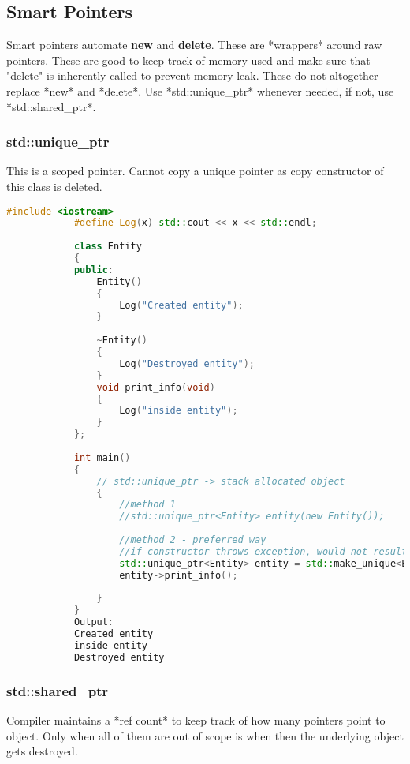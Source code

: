 \documentclass{article}
\begin{document}
    \subsection{Smart Pointers}
        Smart pointers automate \textbf{new} and \textbf{delete}. These are *wrappers* around raw pointers.
        These are good to keep track of memory used and make sure that "delete" is inherently called to prevent memory leak. 
        These do not altogether replace *new* and *delete*. 
        Use *std::unique\_ptr* whenever needed, if not, use *std::shared\_ptr*.
        
        \subsubsection{std::unique\_ptr}
        This is a scoped pointer. 
        Cannot copy a unique pointer as copy constructor of this class is deleted.
        
        \begin{lstlisting}[language=C++, caption=std::unique\_ptr example]
            #include <iostream>
            #define Log(x) std::cout << x << std::endl;
            
            class Entity
            {
            public:
            	Entity()
            	{
            		Log("Created entity");
            	}
            
            	~Entity()
            	{
            		Log("Destroyed entity");
            	}
            	void print_info(void)
            	{
            		Log("inside entity");
            	}
            };
            
            int main()
            {
            	// std::unique_ptr -> stack allocated object
            	{
            		//method 1
            		//std::unique_ptr<Entity> entity(new Entity());
            
            		//method 2 - preferred way
            		//if constructor throws exception, would not result in dangling pointer
            		std::unique_ptr<Entity> entity = std::make_unique<Entity>();
            		entity->print_info();
            
            	}
            }
            Output:
            Created entity
            inside entity
            Destroyed entity
        \end{lstlisting}
        
        \subsubsection{std::shared\_ptr}
        Compiler maintains a *ref count* to keep track of how many pointers point to object. Only when all of them are out of scope is when then the underlying object gets destroyed.
        
\end{document}
